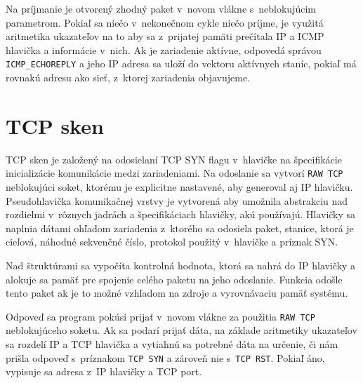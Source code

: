 Na príjmanie je otvorený zhodný paket v~novom vlákne s~neblokujúcim parametrom. Pokiaľ sa niečo v~nekonečnom cykle niečo príjme, je využitá aritmetika ukazateľov na to aby sa z~prijatej pamäti prečítala IP a ICMP hlavička a informácie v~nich. Ak je zariadenie aktívne, odpovedá správou \texttt{ICMP\_ECHOREPLY} a jeho IP adresa sa uloží do vektoru aktívnych staníc, pokiaľ má rovnakú adresu ako sieť, z~ktorej zariadenia objavujeme. 

\section{TCP sken}
TCP sken je založený na odosielaní TCP SYN flagu v~hlavičke na špecifikácie inicializácie komunikácie medzi zariadeniami. Na odoslanie sa vytvorí \texttt{RAW TCP} neblokujúci soket, ktorému je explicitne nastavené, aby generoval aj IP hlavičku. Pseudohlavička komunikačnej vrstvy je vytvorená aby umožnila abstrakciu nad rozdielmi v~rôznych jadrách a špecifikáciach hlavičky, akú používajú. Hlavičky sa naplnia dátami ohľadom zariadenia z~ktorého sa odosiela paket, stanice, ktorá je cieľová, náhodné sekvenčné číslo, protokol použitý v~hlavičke a príznak SYN. 

Nad štruktúrami sa vypočíta kontrolná hodnota, ktorá sa nahrá do IP hlavičky a alokuje sa pamäť pre spojenie celého paketu na jeho odoslanie. Funkcia odošle tento paket ak je to možné vzhľadom na zdroje a vyrovnávaciu pamäť systému.

Odpoveď sa program pokúsi prijať v~novom vlákne za použitia \texttt{RAW TCP} neblokujúceho soketu. Ak sa podarí prijať dáta, na základe aritmetiky ukazateľov sa rozdelí IP a TCP hlavička a vytiahnú sa potrebné dáta na určenie, či nám prišla odpoveď s~príznakom \texttt{TCP SYN} a zároveň nie s~\texttt{TCP RST}. Pokiaľ áno, vypisuje sa adresa z~IP hlavičky a TCP port.



